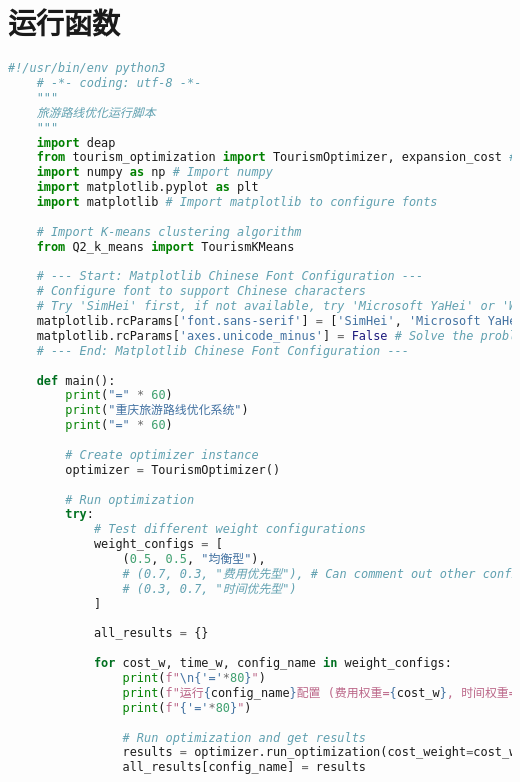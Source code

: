 \section[\hspace{-2pt}运行函数]{{\heiti{} \hspace{-8pt}运行函数}}

\begin{lstlisting}[language=Python]
    #!/usr/bin/env python3
    # -*- coding: utf-8 -*-
    """
    旅游路线优化运行脚本
    """
    import deap
    from tourism_optimization import TourismOptimizer, expansion_cost # Import expansion cost function
    import numpy as np # Import numpy
    import matplotlib.pyplot as plt
    import matplotlib # Import matplotlib to configure fonts
    
    # Import K-means clustering algorithm
    from Q2_k_means import TourismKMeans
    
    # --- Start: Matplotlib Chinese Font Configuration ---
    # Configure font to support Chinese characters
    # Try 'SimHei' first, if not available, try 'Microsoft YaHei' or 'WenQuanYi Micro Hei'
    matplotlib.rcParams['font.sans-serif'] = ['SimHei', 'Microsoft YaHei', 'Arial Unicode MS'] 
    matplotlib.rcParams['axes.unicode_minus'] = False # Solve the problem of '-' displaying as a square
    # --- End: Matplotlib Chinese Font Configuration ---
    
    def main():
        print("=" * 60)
        print("重庆旅游路线优化系统")
        print("=" * 60)
        
        # Create optimizer instance
        optimizer = TourismOptimizer()
        
        # Run optimization
        try:
            # Test different weight configurations
            weight_configs = [
                (0.5, 0.5, "均衡型"),
                # (0.7, 0.3, "费用优先型"), # Can comment out other configurations for faster expansion analysis
                # (0.3, 0.7, "时间优先型")
            ]
            
            all_results = {}
            
            for cost_w, time_w, config_name in weight_configs:
                print(f"\n{'='*80}")
                print(f"运行{config_name}配置 (费用权重={cost_w}, 时间权重={time_w})")
                print(f"{'='*80}")
                
                # Run optimization and get results
                results = optimizer.run_optimization(cost_weight=cost_w, time_weight=time_w)
                all_results[config_name] = results
                

\end{lstlisting}
